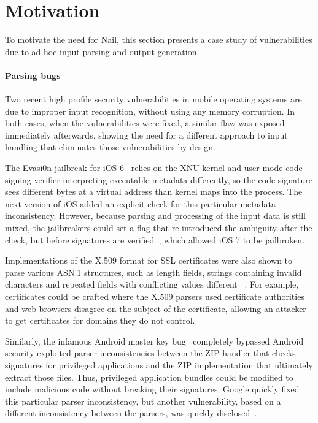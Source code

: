 \section{Motivation}
\label{s:motivation}

To motivate the need for Nail, this section presents a case study of
vulnerabilities due to ad-hoc input parsing and output generation.

\paragraph{Parsing bugs} Two recent high profile security vulnerabilities in mobile operating systems are due to improper
input recognition, without using any memory corruption. In both cases, when the vulnerabilities were
fixed, a similar flaw was exposed immediately afterwards, showing the need for a different approach
to input handling that eliminates those vulnerabilities by design.

The Evasi0n jailbreak for iOS 6~\cite{evaders6} relies on the XNU kernel and
user-mode code-signing verifier interpreting executable metadata differently, so the code signature
sees different bytes at a virtual address than kernel maps into the process. The next version of iOS
added an explicit check for this particular metadata inconsistency. However, because parsing and
processing of the input data is still mixed, the jailbreakers could set a flag that re-introduced
the ambiguity after the check, but before signatures are verified~\cite{geohot-evasion}, which
allowed iOS 7 to be jailbroken.

Implementations of the X.509 format for SSL certificates were also shown to parse various ASN.1
structures, such as length fields, strings containing invalid characters and repeated fields with
conflicting values different ~\cite{DBLP:conf/fc/KaminskyPS10}. For example, certificates could be
crafted where the X.509 parsers used certificate authorities and web browsers disagree on the
subject of the certificate, allowing an attacker to get certificates for domains they do not control.

Similarly, the infamous Android master key bug~\cite{saurik-masterkey} completely bypassed Android
security exploited parser inconsistencies
between the ZIP handler that checks signatures for privileged applications and the ZIP
implementation that ultimately extract those files. Thus, privileged application bundles could be
modified to include malicious code without breaking their signatures. Google quickly fixed this
particular parser inconsistency, but another vulnerability, based on a different inconsistency
between the parsers, was quickly disclosed~\cite{saurik-masterkey2}.


